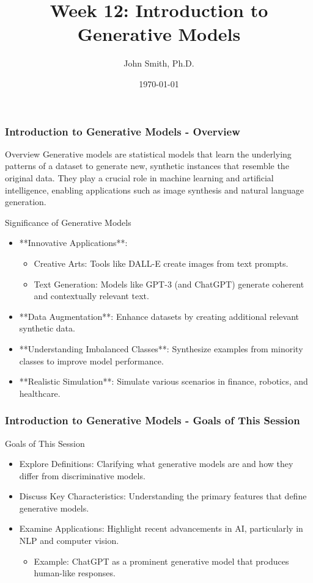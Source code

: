 \documentclass[aspectratio=169]{beamer}
\title[Generative Models]{Week 12: Introduction to Generative Models}
\author[J. Smith]{John Smith, Ph.D.}
\institute[University Name]{
  Department of Computer Science\\
  University Name\\
  \vspace{0.3cm}
  Email: email@university.edu\\
  Website: www.university.edu
}
\date{\today}
\begin{document}
\frame{\titlepage}

\begin{frame}[fragile]
    \frametitle{Introduction to Generative Models - Overview}
    \begin{block}{Overview}
        Generative models are statistical models that learn the underlying patterns of a dataset to generate new, synthetic instances that resemble the original data. They play a crucial role in machine learning and artificial intelligence, enabling applications such as image synthesis and natural language generation.
    \end{block}
    
    \begin{block}{Significance of Generative Models}
        \begin{itemize}
            \item **Innovative Applications**: 
            \begin{itemize}
                \item Creative Arts: Tools like DALL-E create images from text prompts.
                \item Text Generation: Models like GPT-3 (and ChatGPT) generate coherent and contextually relevant text.
            \end{itemize}
            \item **Data Augmentation**: Enhance datasets by creating additional relevant synthetic data.
            \item **Understanding Imbalanced Classes**: Synthesize examples from minority classes to improve model performance.
            \item **Realistic Simulation**: Simulate various scenarios in finance, robotics, and healthcare.
        \end{itemize}
    \end{block}
\end{frame}

\begin{frame}[fragile]
    \frametitle{Introduction to Generative Models - Goals of This Session}
    \begin{block}{Goals of This Session}
        \begin{itemize}
            \item Explore Definitions: Clarifying what generative models are and how they differ from discriminative models.
            \item Discuss Key Characteristics: Understanding the primary features that define generative models.
            \item Examine Applications: Highlight recent advancements in AI, particularly in NLP and computer vision.
                \begin{itemize}
                    \item Example: ChatGPT as a prominent generative model that produces human-like responses.
                \end{itemize}
        \end{itemize}
    \end{block}
\end{frame}
\end{document}
